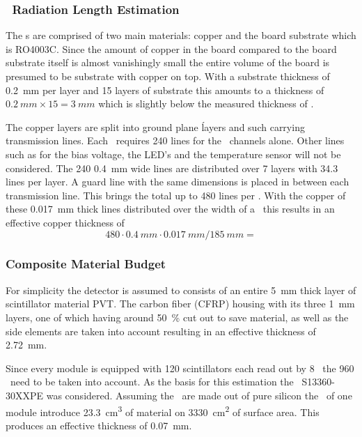 \documentclass[../BTOF_summary.tex]{subfiles}
\begin{document}
\subsubsection*{\railboard\ Radiation Length Estimation}

The \railboard s are comprised of two main materials: copper and the board substrate which is RO4003C.
Since the amount of copper in the board compared to the board substrate itself is almost vanishingly small the entire volume of the board is presumed to be substrate with copper on top.
With a substrate thickness of \SI{0.2}{mm} per layer and 15 layers of substrate this amounts to a thickness of $\SI{0.2}{mm} \times 15 = \SI{3}{mm}$ which is slightly below the measured thickness of .

The copper layers are split into ground plane ĺayers and such carrying transmission lines.
Each \sm\ requires 240 lines for the \sipm\ channels alone.
Other lines such as for the bias voltage, the LED's and the temperature sensor will not be considered.
The 240 \SI{0.4}{mm} wide lines are distributed over 7 layers with 34.3 lines per layer.
A guard line with the same dimensions is placed in between each transmission line.
This brings the total up to 480 lines per \sm .
With the copper of these \SI{0.017}{mm} thick lines distributed over the width of a \sm\ this results in an effective copper thickness of
\[480 \cdot \SI{0.4}{mm} \cdot \SI{0.017}{mm} / \SI{185}{mm} = \]

\subsubsection*{Composite Material Budget}
For simplicity the detector is assumed to consists of an entire \SI{5}{mm} thick layer of scintillator material PVT.
The carbon fiber (CFRP) housing with its three \SI{1}{mm} layers, one of which having around \SI{50}{\percent} cut out to save material, as well as the side elements are taken into account resulting in an effective thickness of \SI{2.72}{mm}.

Since every module is equipped with 120 scintillators each read out by 8 \sipms\ the 960 \sipms\ need to be taken into account. As the basis for this estimation the \hamamatsu\ S13360-30XXPE was considered.%
Assuming the \sipms\ are made out of pure silicon the \sipms\ of one module introduce \SI{23.3}{cm^3} of material on \SI{3330}{cm^2} of surface area. This produces an effective thickness of \SI{0.07}{mm}.
\end{document}
